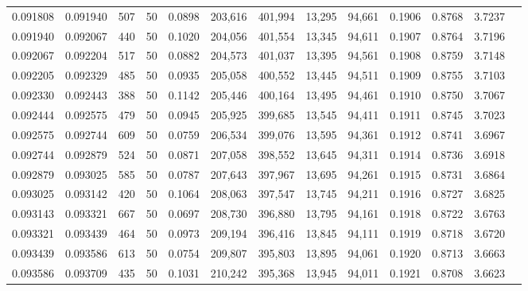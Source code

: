 \begin{tabular}{rrrrrrrrrrrrr}
0.091808 & 0.091940 &   507 &  50 &                                     0.0898 & 203,616 & 401,994 &  13,295 &  94,661 & 0.1906 & 0.8768 & 3.7237 \\
0.091940 & 0.092067 &   440 &  50 &                                     0.1020 & 204,056 & 401,554 &  13,345 &  94,611 & 0.1907 & 0.8764 & 3.7196 \\
0.092067 & 0.092204 &   517 &  50 &                                     0.0882 & 204,573 & 401,037 &  13,395 &  94,561 & 0.1908 & 0.8759 & 3.7148 \\
0.092205 & 0.092329 &   485 &  50 &                                     0.0935 & 205,058 & 400,552 &  13,445 &  94,511 & 0.1909 & 0.8755 & 3.7103 \\
0.092330 & 0.092443 &   388 &  50 &                                     0.1142 & 205,446 & 400,164 &  13,495 &  94,461 & 0.1910 & 0.8750 & 3.7067 \\
0.092444 & 0.092575 &   479 &  50 &                                     0.0945 & 205,925 & 399,685 &  13,545 &  94,411 & 0.1911 & 0.8745 & 3.7023 \\
0.092575 & 0.092744 &   609 &  50 &                                     0.0759 & 206,534 & 399,076 &  13,595 &  94,361 & 0.1912 & 0.8741 & 3.6967 \\
0.092744 & 0.092879 &   524 &  50 &                                     0.0871 & 207,058 & 398,552 &  13,645 &  94,311 & 0.1914 & 0.8736 & 3.6918 \\
0.092879 & 0.093025 &   585 &  50 &                                     0.0787 & 207,643 & 397,967 &  13,695 &  94,261 & 0.1915 & 0.8731 & 3.6864 \\
0.093025 & 0.093142 &   420 &  50 &                                     0.1064 & 208,063 & 397,547 &  13,745 &  94,211 & 0.1916 & 0.8727 & 3.6825 \\
0.093143 & 0.093321 &   667 &  50 &                                     0.0697 & 208,730 & 396,880 &  13,795 &  94,161 & 0.1918 & 0.8722 & 3.6763 \\
0.093321 & 0.093439 &   464 &  50 &                                     0.0973 & 209,194 & 396,416 &  13,845 &  94,111 & 0.1919 & 0.8718 & 3.6720 \\
0.093439 & 0.093586 &   613 &  50 &                                     0.0754 & 209,807 & 395,803 &  13,895 &  94,061 & 0.1920 & 0.8713 & 3.6663 \\
0.093586 & 0.093709 &   435 &  50 &                                     0.1031 & 210,242 & 395,368 &  13,945 &  94,011 & 0.1921 & 0.8708 & 3.6623 \\

\end{tabular}
